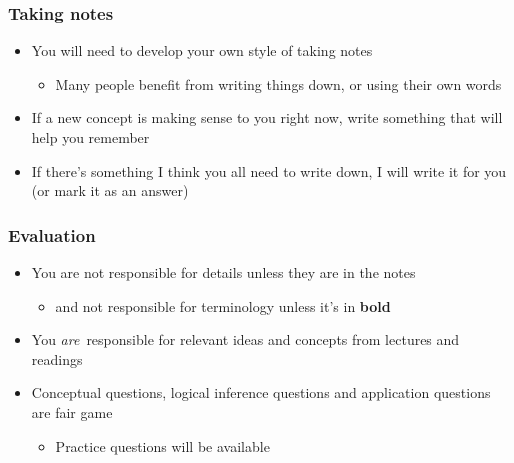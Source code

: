 \documentclass{beamer}
\begin{document}
\begin{frame}


\frametitle{Taking notes}\begin{itemize}

\item You will need to develop your own style of taking notes\begin{itemize}

\item Many people benefit from writing things down, or using their own words\end{itemize}

\item If a new concept is making sense to you right now, write something
	that will help you remember

\item If there's something I think you all need to write down, I will write
	it for you (or mark it as an answer)\end{itemize}
\end{frame}

\begin{frame}


\frametitle{Evaluation}\begin{itemize}

\item You are not responsible for details unless they are in the notes\begin{itemize}

\item and not responsible for terminology unless it's in {\bf bold}\end{itemize}

\item You {\em are\,} responsible for relevant ideas and concepts from lectures
	and readings

\item Conceptual questions, logical inference questions and application questions
	are fair game\begin{itemize}

\item Practice questions will be available\end{itemize}\end{itemize}
\end{frame}
\end{document}
